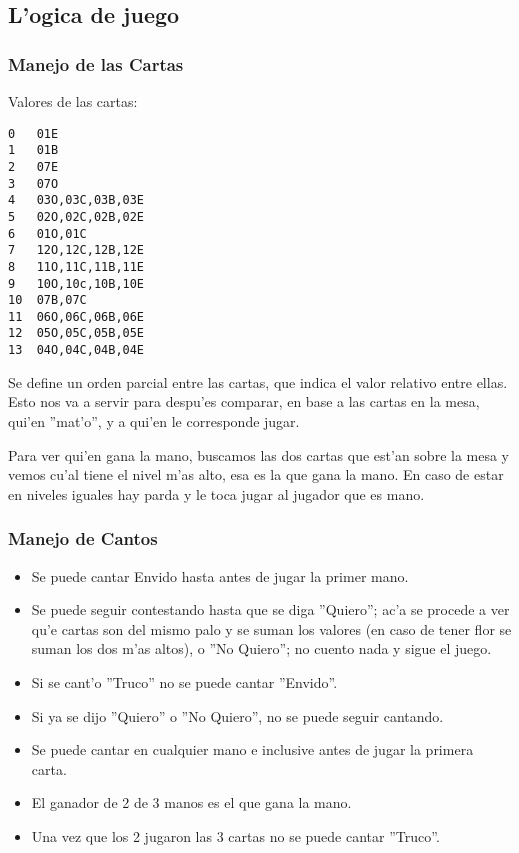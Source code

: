 \subsection{L'ogica de juego}

\subsubsection{Manejo de las Cartas}

Valores de las cartas:
\begin{verbatim}
0   01E
1   01B
2   07E
3   07O
4   03O,03C,03B,03E
5   02O,02C,02B,02E
6   01O,01C
7   12O,12C,12B,12E
8   11O,11C,11B,11E
9   10O,10c,10B,10E
10  07B,07C
11  06O,06C,06B,06E
12  05O,05C,05B,05E
13  04O,04C,04B,04E
\end{verbatim}

Se define un orden parcial entre las cartas, que indica el valor relativo entre ellas. Esto nos va a servir para despu'es comparar, en base a las cartas en la mesa, qui'en ''mat'o'', y a qui'en le corresponde jugar.

Para ver qui'en gana la mano, buscamos las dos cartas que est'an sobre la mesa y vemos cu'al tiene el nivel m'as alto, esa es la que gana la mano. En caso de estar en niveles iguales hay parda y le toca jugar al jugador que es mano.


\subsubsection{Manejo de Cantos}

\begin{itemize}
\item Se puede cantar Envido hasta antes de jugar la primer mano.
\item Se puede seguir contestando hasta que se diga ''Quiero''; ac'a se procede a ver qu'e cartas son del mismo palo y se suman los valores (en caso de tener flor se suman los dos m'as altos), o ''No Quiero''; no cuento nada y sigue el juego.
\item Si se cant'o ''Truco'' no se puede cantar ''Envido''.
\item Si ya se dijo ''Quiero'' o ''No Quiero'', no se puede seguir cantando.
\end{itemize}


\begin{itemize}
\item Se puede cantar en cualquier mano e inclusive antes de jugar la primera carta.
\item El ganador de 2 de 3 manos es el que gana la mano.
\item Una vez que los 2 jugaron las 3 cartas no se puede cantar ''Truco''.
\end{itemize}

